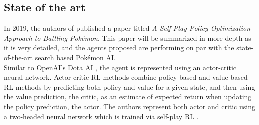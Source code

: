 \subsection{State of the art}
In 2019, the authors of \cite{Huang_Lee_2019} published a paper titled \emph{A Self-Play Policy 
Optimization Approach to Battling Pokémon}. This paper will be summarized in more depth as it
is very detailed, and the agents proposed are performing on par with the state-of-the-art
search based Pokémon AI.\\
Similar to
OpenAI's Dota AI \cite{OpenAI_dota}, the agent is represented using an actor-critic neural network.
Actor-critic RL methods \cite{Konda_Tsitsiklis}
combine policy-based and value-based RL methods by predicting both policy and value for a given 
state, and then using the value prediction, the \grqq critic\grqq, as an estimate of expected
return when updating the policy prediction, the \grqq actor\grqq. The authors represent both
actor and critic using a two-headed neural network which is trained via self-play RL
\cite{Huang_Lee_2019}.

